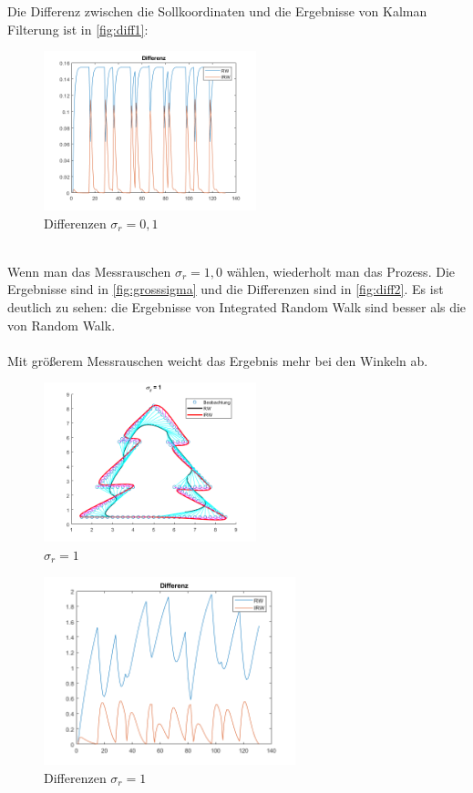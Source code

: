 Die Differenz zwischen die Sollkoordinaten und die Ergebnisse von Kalman Filterung ist in \autoref{fig:diff1}:
\begin{figure}[htbp]
	\centering
	\includegraphics[width=0.55\textwidth]{images/diff1} 
	\caption{Differenzen $\sigma_r = 0,1$} 
	\label{fig:diff1}
\end{figure}\\
\clearpage
Wenn man das Messrauschen $\sigma_r = 1,0$ wählen, wiederholt man das Prozess. Die Ergebnisse sind in \autoref{fig:grosssigma} und die Differenzen sind in \autoref{fig:diff2}. Es ist deutlich zu sehen: die Ergebnisse von Integrated Random Walk sind besser als die von Random Walk. \\\\
Mit größerem Messrauschen weicht das Ergebnis mehr bei den Winkeln ab.
\begin{figure}[htbp]
	\centering
	\includegraphics[width=0.55\textwidth]{images/grosssigma} 
	\caption{$\sigma_r = 1$} 
	\label{fig:grosssigma}
\end{figure}
\begin{figure}[htbp]
	\centering
	\includegraphics[width=0.65\textwidth]{images/diff2} 
	\caption{Differenzen $\sigma_r = 1$} 
	\label{fig:diff2}
\end{figure}